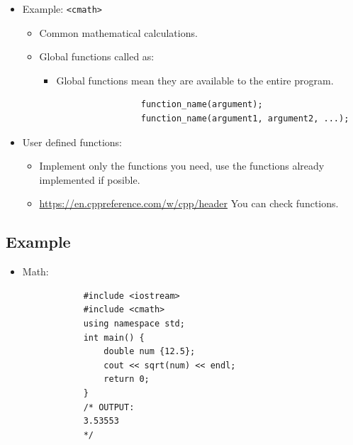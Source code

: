 \begin{itemize}
    \item Example: \texttt{<cmath>}
        \begin{itemize}
            \item Common mathematical calculations.
            \item Global functions called as:   
                \begin{itemize}
                    \item Global functions mean they are available to the entire program.
                \end{itemize}
                \begin{verbatim}
                    function_name(argument);
                    function_name(argument1, argument2, ...);
                \end{verbatim}
        \end{itemize}
    
    \item User defined functions:
        \begin{itemize}
            \item Implement only the functions you need, use the functions already implemented if posible.
            \item \url{https://en.cppreference.com/w/cpp/header} You can check functions.
        \end{itemize}
\end{itemize}

\subsection{Example}
\begin{itemize}
    \item Math:
        \begin{verbatim}
            #include <iostream>
            #include <cmath>
            using namespace std;
            int main() {
                double num {12.5};
                cout << sqrt(num) << endl;
                return 0;
            }
            /* OUTPUT:
            3.53553
            */
        \end{verbatim}
\end{itemize}


